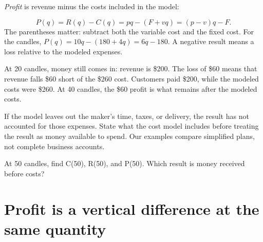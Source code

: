 \documentclass[11pt,letterpaper]{article}
\begin{document}
\emph{Profit} is revenue minus the costs included in the model:

\[P(q)=R(q)-C(q)=pq-(F+vq)=(p-v)q-F.\]
The parentheses matter: subtract both the variable cost and the fixed cost. For the candles, \(P(q)=10q-(180+4q)=6q-180\). A negative result means a loss relative to the modeled expenses.



\par{}\par\medskip


At 20 candles, money still comes in: revenue is \$200. The loss of \$60 means that revenue falls \$60 short of the \$260 cost. Customers paid \$200, while the modeled costs were \$260. At 40 candles, the \$60 profit is what remains after the modeled costs.


\begin{tcolorbox}[title={What is included in ``profit''?},breakable,colback=warm,colbacktitle=warm,coltitle=gold,colframe=gold!35]

If the model leaves out the maker's time, taxes, or delivery, the result has not accounted for those expenses. State what the cost model includes before treating the result as money available to spend. Our examples compare simplified plans, not complete business accounts.


\end{tcolorbox}


\begin{tcolorbox}[title={Pause and try 3},breakable]
At 50 candles, find C(50), R(50), and P(50). Which result is money received before costs?
\end{tcolorbox}

\clearpage

\section{Profit is a vertical difference at the same quantity}
\end{document}
